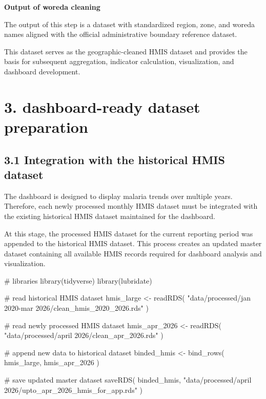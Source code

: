 \documentclass[
  letterpaper,
  DIV=11,
  numbers=noendperiod]{scrartcl}
\newenvironment{Shaded}{\begin{snugshade}}{\end{snugshade}}
\newcommand{\CommentTok}[1]{\textcolor[rgb]{0.37,0.37,0.37}{#1}}
\newcommand{\FunctionTok}[1]{\textcolor[rgb]{0.28,0.35,0.67}{#1}}
\newcommand{\NormalTok}[1]{\textcolor[rgb]{0.00,0.23,0.31}{#1}}
\newcommand{\OtherTok}[1]{\textcolor[rgb]{0.00,0.23,0.31}{#1}}
\newcommand{\StringTok}[1]{\textcolor[rgb]{0.13,0.47,0.30}{#1}}
\begin{document}
\textbf{Output of woreda cleaning}

The output of this step is a dataset with standardized region, zone, and
woreda names aligned with the official administrative boundary reference
dataset.

This dataset serves as the geographic-cleaned HMIS dataset and provides
the basis for subsequent aggregation, indicator calculation,
visualization, and dashboard development.

\section{3. dashboard-ready dataset
preparation}\label{dashboard-ready-dataset-preparation}

\subsection{3.1 Integration with the historical HMIS
dataset}\label{integration-with-the-historical-hmis-dataset}

The dashboard is designed to display malaria trends over multiple years.
Therefore, each newly processed monthly HMIS dataset must be integrated
with the existing historical HMIS dataset maintained for the dashboard.

At this stage, the processed HMIS dataset for the current reporting
period was appended to the historical HMIS dataset. This process creates
an updated master dataset containing all available HMIS records required
for dashboard analysis and visualization.

\begin{Shaded}
\begin{Highlighting}[]
\CommentTok{\# libraries}
\FunctionTok{library}\NormalTok{(tidyverse)}
\FunctionTok{library}\NormalTok{(lubridate)}

\CommentTok{\# read historical HMIS dataset}
\NormalTok{hmis\_large }\OtherTok{\textless{}{-}} \FunctionTok{readRDS}\NormalTok{(}
  \StringTok{"data/processed/jan 2020{-}mar 2026/clean\_hmis\_2020\_2026.rds"}
\NormalTok{)}

\CommentTok{\# read newly processed HMIS dataset}
\NormalTok{hmis\_apr\_2026 }\OtherTok{\textless{}{-}} \FunctionTok{readRDS}\NormalTok{(}
  \StringTok{"data/processed/april 2026/clean\_apr\_2026.rds"}
\NormalTok{)}

\CommentTok{\# append new data to historical dataset}
\NormalTok{binded\_hmis }\OtherTok{\textless{}{-}} \FunctionTok{bind\_rows}\NormalTok{(}
\NormalTok{  hmis\_large,}
\NormalTok{  hmis\_apr\_2026}
\NormalTok{)}

\CommentTok{\# save updated master dataset}
\FunctionTok{saveRDS}\NormalTok{(}
\NormalTok{  binded\_hmis,}
  \StringTok{"data/processed/april 2026/upto\_apr\_2026\_hmis\_for\_app.rds"}
\NormalTok{)}
\end{Highlighting}
\end{Shaded}
\end{document}
